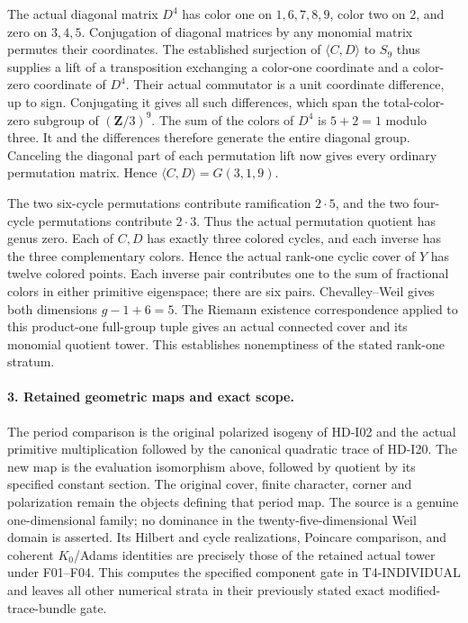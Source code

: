 The actual diagonal matrix $D^4$ has color one on
$1,6,7,8,9$, color two on $2$, and zero on $3,4,5$.
Conjugation of diagonal matrices by any monomial matrix
permutes their coordinates. The established surjection
of $\langle C,D\rangle$ to $S_9$ thus supplies a lift
of a transposition exchanging a color-one coordinate
and a color-zero coordinate of $D^4$. Their actual
commutator is a unit coordinate difference, up to sign.
Conjugating it gives all such differences, which span
the total-color-zero subgroup of $(\mathbf Z/3)^9$.
The sum of the colors of $D^4$ is $5+2=1$ modulo three.
It and the differences therefore generate the entire
diagonal group. Canceling the diagonal part of each
permutation lift now gives every ordinary permutation
matrix. Hence $\langle C,D\rangle=G(3,1,9)$.

The two six-cycle permutations contribute ramification
$2\cdot5$, and the two four-cycle permutations contribute
$2\cdot3$. Thus the actual permutation quotient has genus
zero. Each of $C,D$ has exactly three colored cycles, and
each inverse has the three complementary colors. Hence
the actual rank-one cyclic cover of $Y$ has twelve
colored points. Each inverse pair contributes one to the
sum of fractional colors in either primitive eigenspace;
there are six pairs. Chevalley--Weil gives both dimensions
$g-1+6=5$. The Riemann existence correspondence applied
to this product-one full-group tuple gives an actual
connected cover and its monomial quotient tower. This
establishes nonemptiness of the stated rank-one stratum.

\paragraph{3. Retained geometric maps and exact scope.}
The period comparison is the original polarized isogeny
of HD-I02 and the actual primitive multiplication followed
by the canonical quadratic trace of HD-I20. The new map
is the evaluation isomorphism above, followed by quotient
by its specified constant section. The original cover,
finite character, corner and polarization remain the
objects defining that period map. The source is a genuine
one-dimensional family; no dominance in the
twenty-five-dimensional Weil domain is asserted.
Its Hilbert and cycle realizations, Poincare comparison,
and coherent $K_0$/Adams identities are precisely those
of the retained actual tower under F01--F04. This computes
the specified component gate in T4-INDIVIDUAL and leaves
all other numerical strata in their previously stated
exact modified-trace-bundle gate.

